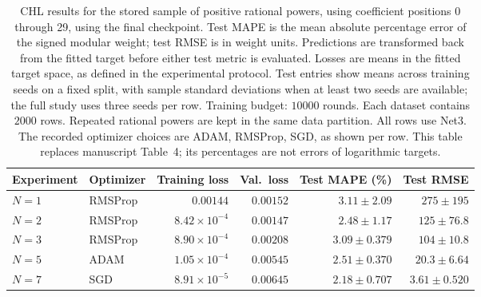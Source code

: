 \begin{table}[!htbp]
\centering
\small
\setlength{\tabcolsep}{4pt}
\renewcommand{\arraystretch}{1.18}
\begin{tabular}{@{}llrrrr@{}}
\toprule
Experiment & Optimizer & Training loss & Val.\ loss & Test MAPE (\%) & Test RMSE \\
\midrule
$N=1$ & RMSProp & $0.00144$ & $0.00152$ & $3.11\pm2.09$ & $275\pm195$ \\
$N=2$ & RMSProp & $8.42\times10^{-4}$ & $0.00147$ & $2.48\pm1.17$ & $125\pm76.8$ \\
$N=3$ & RMSProp & $8.90\times10^{-4}$ & $0.00208$ & $3.09\pm0.379$ & $104\pm10.8$ \\
$N=5$ & ADAM & $1.05\times10^{-4}$ & $0.00545$ & $2.51\pm0.370$ & $20.3\pm6.64$ \\
$N=7$ & SGD & $8.91\times10^{-5}$ & $0.00645$ & $2.18\pm0.707$ & $3.61\pm0.520$ \\
\bottomrule
\end{tabular}
\caption{\textsf{CHL results for the stored sample of positive rational powers, using coefficient positions 0 through 29, using the final checkpoint. Test MAPE is the mean absolute percentage error of the signed modular weight; test RMSE is in weight units. Predictions are transformed back from the fitted target before either test metric is evaluated. Losses are means in the fitted target space, as defined in the experimental protocol. Test entries show means across training seeds on a fixed split, with sample standard deviations when at least two seeds are available; the full study uses three seeds per row. Training budget: $10000$ rounds. Each dataset contains $2000$ rows. Repeated rational powers are kept in the same data partition. All rows use Net3. The recorded optimizer choices are ADAM, RMSProp, SGD, as shown per row. This table replaces manuscript Table~4; its percentages are not errors of logarithmic targets.}}
\label{tab:chl-revised-4-final}
\end{table}
